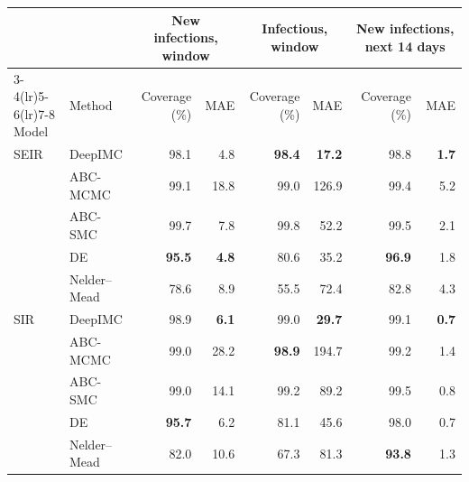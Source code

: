 \begin{tabular}{llrrrrrr}
\toprule
 &  & \multicolumn{2}{c}{New infections, window} & \multicolumn{2}{c}{Infectious, window} & \multicolumn{2}{c}{New infections, next 14 days} \\
\cmidrule(lr){3-4}\cmidrule(lr){5-6}\cmidrule(lr){7-8}
Model & Method & Coverage (\%) & MAE & Coverage (\%) & MAE & Coverage (\%) & MAE \\
\midrule
SEIR & DeepIMC & 98.1 & 4.8 & \textbf{98.4} & \textbf{17.2} & 98.8 & \textbf{1.7} \\
 & ABC-MCMC & 99.1 & 18.8 & 99.0 & 126.9 & 99.4 & 5.2 \\
 & ABC-SMC & 99.7 & 7.8 & 99.8 & 52.2 & 99.5 & 2.1 \\
 & DE & \textbf{95.5} & \textbf{4.8} & 80.6 & 35.2 & \textbf{96.9} & 1.8 \\
 & Nelder--Mead & 78.6 & 8.9 & 55.5 & 72.4 & 82.8 & 4.3 \\
\midrule
SIR & DeepIMC & 98.9 & \textbf{6.1} & 99.0 & \textbf{29.7} & 99.1 & \textbf{0.7} \\
 & ABC-MCMC & 99.0 & 28.2 & \textbf{98.9} & 194.7 & 99.2 & 1.4 \\
 & ABC-SMC & 99.0 & 14.1 & 99.2 & 89.2 & 99.5 & 0.8 \\
 & DE & \textbf{95.7} & 6.2 & 81.1 & 45.6 & 98.0 & 0.7 \\
 & Nelder--Mead & 82.0 & 10.6 & 67.3 & 81.3 & \textbf{93.8} & 1.3 \\
\bottomrule
\end{tabular}
